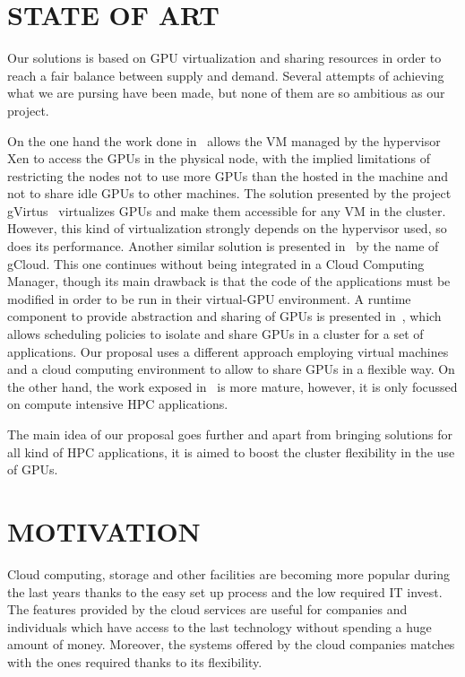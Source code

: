 \documentclass[a4paper,twoside]{article}
\begin{document}
\section{\uppercase{State of Art}}
\label{sec:state}
Our solutions is based on GPU virtualization and sharing resources in order
to reach a fair balance between supply and demand. 
Several attempts of achieving what we are pursing have been
made, but none of them are so ambitious as our project. 

On
the one hand the work done in~\cite{younge2013enabling} allows the VM managed
by the hypervisor Xen to access the GPUs in the physical
node, with the implied limitations of restricting the nodes not
to use more GPUs than the hosted in the machine and not
to share idle GPUs to other machines. The solution presented 
by the project gVirtus~\cite{giunta2010gpgpu} virtualizes GPUs and make
them accessible for any VM in the cluster. However, this kind
of virtualization strongly depends on the hypervisor used, so
does its performance. Another similar solution is presented in~\cite{diab2013dynamic} by the name of gCloud. 
This one continues without being integrated in a Cloud Computing Manager, though its main
drawback is that the code of the applications must be modified
in order to be run in their virtual-GPU environment. A runtime component to provide abstraction
and sharing of GPUs is presented in~\cite{becchi2012virtual}, which allows scheduling policies 
to isolate and share GPUs in a cluster for a set of applications. Our proposal uses a different 
approach employing virtual machines and a cloud computing environment to allow to share GPUs in a flexible way.
On the other hand, the work exposed in~\cite{jungpgpu} is more mature, however,
it is only focussed on compute intensive HPC applications. 

The main idea of our proposal goes further and apart from
bringing solutions for all kind of HPC applications, it is aimed
to boost the cluster flexibility in the use of GPUs.

\section{\uppercase{Motivation}}
\label{sec:motivation}

Cloud computing, storage and other facilities are becoming 
more popular during the last years thanks to the easy set up 
process and the low required IT invest. The features provided 
by the cloud services are useful for companies and individuals 
which have access to the last technology without spending a 
huge amount of money. Moreover, the systems offered by the cloud 
companies matches with the ones required thanks to its flexibility.
\end{document}
